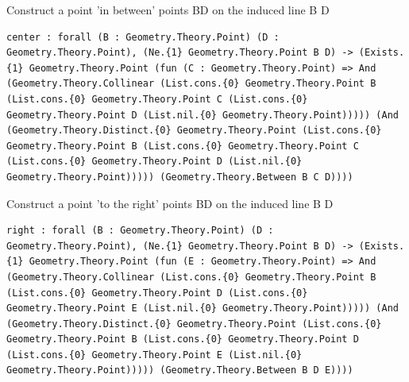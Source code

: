 \begin{theorem}
  \label{Geometry.Theory.B2.center}
  \leanok
  Construct a point 'in between' points BD on the induced line B D 
\begin{verbatim}center : forall (B : Geometry.Theory.Point) (D : Geometry.Theory.Point), (Ne.{1} Geometry.Theory.Point B D) -> (Exists.{1} Geometry.Theory.Point (fun (C : Geometry.Theory.Point) => And (Geometry.Theory.Collinear (List.cons.{0} Geometry.Theory.Point B (List.cons.{0} Geometry.Theory.Point C (List.cons.{0} Geometry.Theory.Point D (List.nil.{0} Geometry.Theory.Point))))) (And (Geometry.Theory.Distinct.{0} Geometry.Theory.Point (List.cons.{0} Geometry.Theory.Point B (List.cons.{0} Geometry.Theory.Point C (List.cons.{0} Geometry.Theory.Point D (List.nil.{0} Geometry.Theory.Point))))) (Geometry.Theory.Between B C D))))\end{verbatim}
\end{theorem}

\begin{theorem}
  \label{Geometry.Theory.B2.right}
  \leanok
  Construct a point 'to the right' points BD on the induced line B D 
\begin{verbatim}right : forall (B : Geometry.Theory.Point) (D : Geometry.Theory.Point), (Ne.{1} Geometry.Theory.Point B D) -> (Exists.{1} Geometry.Theory.Point (fun (E : Geometry.Theory.Point) => And (Geometry.Theory.Collinear (List.cons.{0} Geometry.Theory.Point B (List.cons.{0} Geometry.Theory.Point D (List.cons.{0} Geometry.Theory.Point E (List.nil.{0} Geometry.Theory.Point))))) (And (Geometry.Theory.Distinct.{0} Geometry.Theory.Point (List.cons.{0} Geometry.Theory.Point B (List.cons.{0} Geometry.Theory.Point D (List.cons.{0} Geometry.Theory.Point E (List.nil.{0} Geometry.Theory.Point))))) (Geometry.Theory.Between B D E))))\end{verbatim}
\end{theorem}

